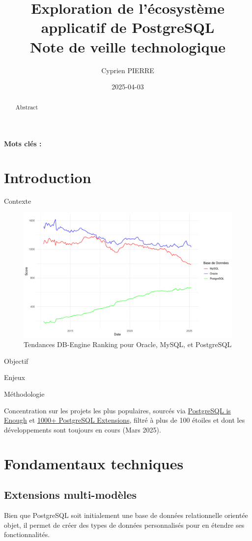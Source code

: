 \documentclass[a4paper,12pt]{article}
\author{Cyprien PIERRE \orcidlink{0009-0009-9040-6795}}
\date{2025-04-03}
\title{Exploration de l'écosystème applicatif de PostgreSQL\\\medskip
\large Note de veille technologique}
\begin{document}
\maketitle
\begin{abstract}
Abstract
\end{abstract}

\textbf{Mots clés : }

\begin{multicols*}{2}
\section*{Introduction}
\label{sec:orgc607f10}
Contexte

\begin{figure}[H]
\centering
\includegraphics[width=.9\linewidth]{charts/top5.pdf}
\caption{\label{fig:org58b7758}Tendances DB-Engine Ranking pour Oracle, MySQL, et PostgreSQL}
\end{figure} 

Objectif 

Enjeux

Méthodologie

Concentration sur les projets les plus populaires, sourcés via \href{https://gist.github.com/cpursley/c8fb81fe8a7e5df038158bdfe0f06dbb}{PostgreSQL is Enough} et \href{https://gist.github.com/joelonsql/e5aa27f8cc9bd22b8999b7de8aee9d47}{1000+ PostgreSQL Extensions}, filtré à plus de 100 étoiles et dont les développements sont toujours en cours (Mars 2025).
\section*{Fondamentaux techniques}
\label{sec:org3777d92}
\subsection*{Extensions multi-modèles}
\label{sec:orgee32f26}
Bien que PostgreSQL soit initialement une base de données relationnelle orientée objet, il permet de créer des types de données personnalisés pour en étendre ses fonctionnalités.


\end{multicols*}
\end{document}
